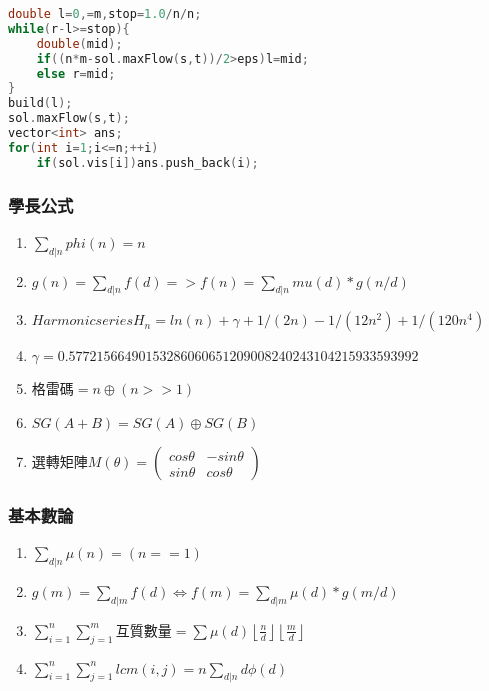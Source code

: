 \begin{lstlisting}[language=C++]
double l=0,=m,stop=1.0/n/n;
while(r-l>=stop){
	double(mid);
	if((n*m-sol.maxFlow(s,t))/2>eps)l=mid;
	else r=mid;
}
build(l);
sol.maxFlow(s,t);
vector<int> ans;
for(int i=1;i<=n;++i)
	if(sol.vis[i])ans.push_back(i);
\end{lstlisting}


\subsubsection{學長公式}
\begin{enumerate}\itemsep = -4pt
\item $\sum_{d|n} phi(n) = n$
\item $g(n) = \sum_{d|n} f(d) => f(n) = \sum_{d|n} mu(d)*g(n/d)$
\item $Harmonic series H_n = ln(n) + \gamma + 1/(2n) - 1/(12n^2) + 1/(120n^4)$
\item $ \gamma = 0.57721566490153286060651209008240243104215933593992$
\item 格雷碼$=n\oplus (n>>1)$
\item $SG(A+B)=SG(A)\oplus SG(B)$
\item 選轉矩陣$M(\theta)= \left( \begin{array}{ccc}
cos\theta & -sin\theta \\ 
sin\theta &  cos\theta
\end{array} \right)$
\end{enumerate}

\subsubsection{基本數論}
\begin{enumerate}\itemsep = -4pt
	\item $\sum_{d|n} \mu (n)=(n==1)$
	\item $g(m)=\sum_{d|m}f(d)\Leftrightarrow f(m)=\sum_{d|m}\mu (d)*g(m/d)$
	\item $\sum_{i=1}^n\sum_{j=1}^m$互質數量$=\sum \mu (d)\left \lfloor \frac{n}{d} \right \rfloor \left \lfloor \frac{m}{d} \right \rfloor$
	\item $\sum_{i=1}^n\sum_{j=1}^nlcm(i,j)=n\sum_{d|n}d\phi (d)$
\end{enumerate}

